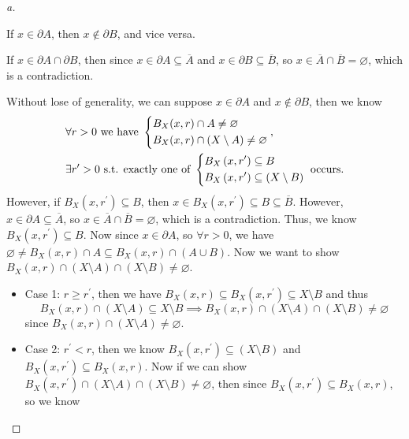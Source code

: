 \begin{proof}[a]
  \begin{claim}
    If \(x \in \partial A\), then \(x \notin \partial B\), and vice versa.   
  \end{claim}
  \begin{explanation}
    If \(x \in \partial A \cap \partial B\), then since \(x \in \partial A \subseteq \overline{A} \) and \(x \in \partial B \subseteq \overline{B} \), so \(x \in \overline{A} \cap \overline{B} = \varnothing  \), which is a contradiction.     
  \end{explanation}
  Without lose of generality, we can suppose \(x \in \partial A\) and \(x \notin \partial B\), then we know 
  \begin{align*}
    &\forall r > 0 \text{ we have }
    \begin{dcases}
      B_X(x, r) \cap A \neq \varnothing \\
      B_X(x, r) \cap \left( X \setminus A \right) \neq \varnothing
    \end{dcases}, \\
    &\exists r^{\prime} > 0 \text{ s.t. exactly one of } 
    \begin{dcases}
      B_X \left( x, r^{\prime}  \right) \subseteq B \\
      B_X \left( x, r^{\prime}  \right) \subseteq (X\setminus B)
    \end{dcases} \text{ occurs.}
  \end{align*}
  However, if \(B_X \left( x, r^{\prime}  \right) \subseteq B  \), then \(x \in B_X \left( x, r^{\prime}  \right) \subseteq B \subseteq \overline{B}  \). However, \(x \in \partial A \subseteq \overline{A} \), so \(x \in \overline{A} \cap \overline{B} = \varnothing   \), which is a contradiction. Thus, we know \(B_X \left( x, r^{\prime}  \right) \subseteq B \). Now since \(x \in \partial A\), so \(\forall r > 0\), we have \(\varnothing \neq B_X (x, r) \cap A \subseteq B_X(x, r) \cap (A \cup B)\). Now we want to show \(B_X(x, r) \cap (X \setminus A) \cap (X \setminus B) \neq \varnothing \).  
  \begin{itemize}
    \item Case 1: \(r \ge r^{\prime} \), then we have \(B_X(x, r) \subseteq B_X \left( x, r^{\prime}  \right) \subseteq X \setminus B\) and thus 
    \[
      B_X (x, r) \cap \left( X \setminus A \right) \subseteq X \setminus B \implies B_X(x, r) \cap \left( X \setminus A \right) \cap \left( X \setminus B \right) \neq \varnothing    
    \] since \(B_X(x, r) \cap \left( X \setminus A \right) \neq \varnothing  \). 
    \item Case 2: \(r^{\prime} < r\), then we know \(B_X \left( x, r^{\prime}  \right) \subseteq (X \setminus B) \) and \(B_X \left( x, r^{\prime}  \right) \subseteq B_X(x, r) \). Now if we can show \(B_X \left( x, r^{\prime}  \right) \cap (X \setminus A) \cap (X \setminus B) \neq \varnothing \), then since \(B_X \left( x, r^{\prime}  \right) \subseteq B_X(x, r)\), so we know 

\end{itemize}
\end{proof}
